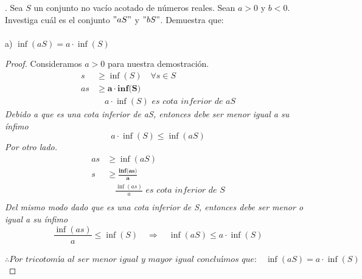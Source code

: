 \documentclass{article}
\begin{document}
  . Sea \(S\) un conjunto no vacío acotado de números reales. Sean \(a>0\) y \(b<0\). Investiga cuál es el conjunto \("aS"\) y \("bS"\). Demuestra que: \\\\
  
  a) \(\inf(aS)=a\cdot \inf (S)\) \\
  \begin{proof}
    Consideramos \(a > 0\) para nuestra demostración. \\
    \begin{align*}
        s &\geq \inf (S) \quad \forall s \in S\\
        as &\geq \textbf{a} \cdot \textbf{inf(S)} \\
        &\quad a \cdot \inf (S)\textit{ es cota inferior de aS}
    \end{align*}
    \textit{Debido a que es una cota inferior de aS, entonces debe ser menor igual a su ínfimo} \\
    \[ a \cdot \inf (S) \leq \inf(aS) \]
    \textit{Por otro lado.} \\
    \begin{align*}
        as &\geq \inf(aS) \\
        s &\geq \frac{\textbf{inf(as)}}{\textbf{a}} \\
        &\quad \frac{\inf(as)}{a} \textit{ es cota inferior de S} \\
    \end{align*}
    \textit{Del mismo modo dado que es una cota inferior de S, entonces debe ser menor o igual a su ínfimo}
    \[ \frac{\inf(as)}{a} \leq \inf (S) \quad \Rightarrow \quad \inf(aS) \leq a \cdot \inf (S)\] \\
    \[ \therefore \textit{Por tricotomía al ser menor igual y mayor igual concluímos que:} \quad  \inf(aS)=a\cdot \inf (S) \]
  \end{proof}
  
\end{document}
